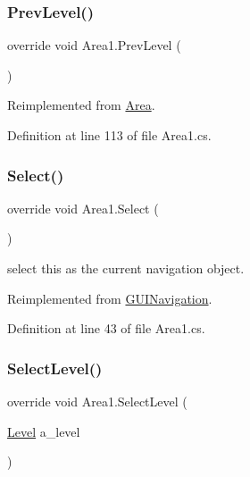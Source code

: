 \subsubsection{\texorpdfstring{Prev\+Level()}{PrevLevel()}}
{\footnotesize\ttfamily override void Area1.\+Prev\+Level (\begin{DoxyParamCaption}{ }\end{DoxyParamCaption})\hspace{0.3cm}{\ttfamily [virtual]}}



Reimplemented from \mbox{\hyperlink{class_area_a17eb7b6ddece1384c868a0c655cd98c4}{Area}}.



Definition at line 113 of file Area1.\+cs.

\mbox{\label{class_area1_a007f43862f61bfad75a3df88ed84f5e1}} 
\subsubsection{\texorpdfstring{Select()}{Select()}}
{\footnotesize\ttfamily override void Area1.\+Select (\begin{DoxyParamCaption}{ }\end{DoxyParamCaption})\hspace{0.3cm}{\ttfamily [virtual]}}



select this as the current navigation object. 



Reimplemented from \mbox{\hyperlink{class_g_u_i_navigation_a4c40fc7986ac35247bc8f77c615e7847}{G\+U\+I\+Navigation}}.



Definition at line 43 of file Area1.\+cs.

\mbox{\label{class_area1_aa49025530816d90d96ec3665b4f727d2}} 
\subsubsection{\texorpdfstring{Select\+Level()}{SelectLevel()}}
{\footnotesize\ttfamily override void Area1.\+Select\+Level (\begin{DoxyParamCaption}\item[{\mbox{\hyperlink{class_level}{Level}}}]{a\+\_\+level }\end{DoxyParamCaption})\hspace{0.3cm}{\ttfamily [virtual]}}



